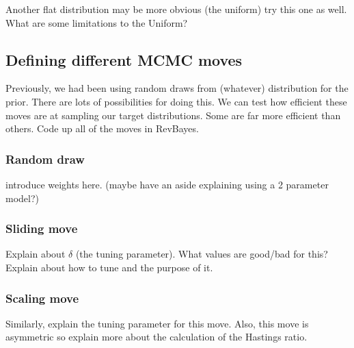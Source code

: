 Another flat distribution may be more obvious (the uniform) try this one as well. What are some limitations to the Uniform? 

\subsection{Defining different MCMC moves}

Previously, we had been using random draws from (whatever) distribution for the prior. There are lots of possibilities for doing this. We can test how efficient these moves are at sampling our target distributions. Some are far more efficient than others. Code up all of the moves in RevBayes.

\subsubsection{Random draw}
introduce weights here. (maybe have an aside explaining using a 2 parameter model?)
\subsubsection{Sliding move}
Explain about $\delta$ (the tuning parameter). What values are good/bad for this? Explain about how to tune and the purpose of it.

\subsubsection{Scaling move}
Similarly, explain the tuning parameter for this move. Also, this move is asymmetric so explain more about the calculation of the Hastings ratio. 

